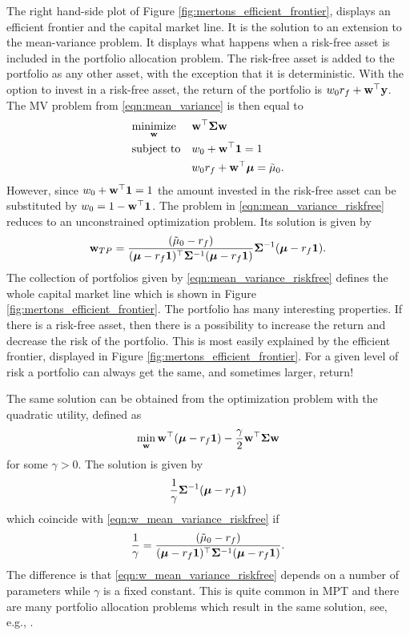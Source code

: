 \documentclass[12pt, oneside]{book}\usepackage{knitr}
\begin{document}
{The right hand-side plot of Figure \ref{fig:mertons_efficient_frontier}, displays an efficient frontier and the capital market line.
It is the solution to an extension to the mean-variance problem.
It displays what happens when a risk-free asset is included in the portfolio allocation problem. 
The risk-free asset is added to the portfolio as any other asset, with the exception that it is deterministic.
With the option to invest in a risk-free asset, the return of the portfolio is $w_0 r_f + \mathbf{w}^\top \mathbf{y}$. 
The MV problem from \eqref{eqn:mean_variance} is then equal to
\begin{equation}\label{eqn:mean_variance_riskfree}
\begin{aligned}
& \underset{\mathbf{w}}{\text{minimize}} 
& & \mathbf{w}^\top \mathbf{\Sigma} \mathbf{w} \\
& \text{subject to}
& & w_0 + \mathbf{w}^\top \mathbf{1} = 1 \\
& && w_0 r_f + \mathbf{w}^\top \mbox{\boldmath$\mu$} = \tilde\mu_0. \\
\end{aligned}
\end{equation}
However, since $w_0 + \mathbf{w}^\top \mathbf{1}=1$ the amount invested in the risk-free asset can be substituted by $w_0=1-\mathbf{w}^\top \mathbf{1}$.
The problem in \eqref{eqn:mean_variance_riskfree} reduces to an unconstrained optimization problem. 
Its solution is given by 
\begin{equation}\label{eqn:w_mean_variance_riskfree}
  \mathbf{w}_{TP} = \frac{(\tilde\mu_0-r_f)}{(\mbox{\boldmath$\mu$}-r_f \mathbf{1})^\top \mathbf{\Sigma}^{-1} (\mbox{\boldmath$\mu$}-r_f \mathbf{1})} \mathbf{\Sigma}^{-1} (\mbox{\boldmath$\mu$}-r_f \mathbf{1}).
\end{equation}
The collection of portfolios given by \eqref{eqn:mean_variance_riskfree} defines the whole capital market line which is shown in Figure \ref{fig:mertons_efficient_frontier}. 
The portfolio has many interesting properties. 
If there is a risk-free asset, then there is a possibility to increase the return and decrease the risk of the portfolio. 
This is most easily explained by the efficient frontier, displayed in Figure \ref{fig:mertons_efficient_frontier}. 
For a given level of risk a portfolio can always get the same, and sometimes larger, return! 

The same solution can be obtained from the optimization problem with the quadratic utility, defined as 
$$\min_{\mathbf{w}} \mathbf{w}^\top (\mbox{\boldmath$\mu$}- r_f\mathbf{1}) - \frac{\gamma}{2} \mathbf{w}^\top \mathbf{\Sigma} \mathbf{w}$$ 
for some $\gamma > 0$.
The solution is given by 
\begin{equation}\label{eqn:TP_def}
  \frac{1}{\gamma}\mathbf{\Sigma}^{-1} (\mbox{\boldmath$\mu$}-r_f \mathbf{1})
\end{equation}
which coincide with \eqref{eqn:w_mean_variance_riskfree} if 
$$\frac{1}{\gamma} = \frac{(\tilde\mu_0-r_f)}{(\mbox{\boldmath$\mu$}-r_f \mathbf{1})^\top \mathbf{\Sigma}^{-1} (\mbox{\boldmath$\mu$}-r_f \mathbf{1})}.$$ 
The difference is that \eqref{eqn:w_mean_variance_riskfree} depends on a number of parameters while $\gamma$ is a fixed constant.
This is quite common in MPT and there are many portfolio allocation problems which result in the same solution, see, e.g., \citet{bodnar2013equivalence}.

}
\end{document}
